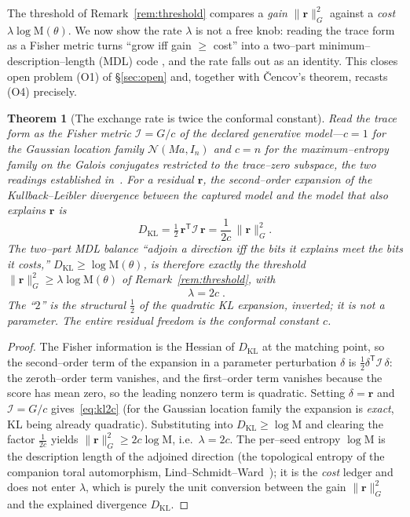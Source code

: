 \documentclass[11pt]{article}
\theoremstyle{plain}
\newtheorem{theorem}{Theorem}[section]
\theoremstyle{definition}
\theoremstyle{remark}
\newcommand{\Mah}{\mathrm{M}}
\newcommand{\Fish}{\mathcal{I}}
\newcommand{\rr}{\mathbf{r}}
\newcommand{\GG}{G}
\newcommand{\transpose}{^{\mathsf{T}}}
\begin{document}
The threshold of Remark~\ref{rem:threshold} compares a \emph{gain} $\lVert\rr\rVert_\GG^2$ against a \emph{cost}
$\lambda\log\Mah(\theta)$. We now show the rate $\lambda$ is not a free knob: reading the trace form as a Fisher
metric turns ``grow iff gain $\ge$ cost'' into a two--part minimum--description--length (MDL) code
\cite{Rissanen}, and the rate falls out as an identity. This closes open problem (O1) of \S\ref{sec:open} and,
together with \v{C}encov's theorem, recasts (O4) precisely.

\begin{theorem}[The exchange rate is twice the conformal constant]\label{thm:lambda2c}
Read the trace form as the Fisher metric $\Fish=\GG/c$ of the declared generative model---$c=1$ for the
Gaussian location family $\mathcal N(Ma,I_n)$ and $c=n$ for the maximum--entropy family on the Galois conjugates
restricted to the trace--zero subspace, the two readings established in~\cite{VectorSubstrate}. For a residual
$\rr$, the second--order expansion of the Kullback--Leibler divergence between the captured model and the model
that also explains $\rr$ is
\begin{equation}\label{eq:kl2c}
  D_{\mathrm{KL}}=\tfrac12\,\rr\transpose\Fish\,\rr=\frac1{2c}\,\lVert\rr\rVert_\GG^2 .
\end{equation}
The two--part MDL balance ``adjoin a direction iff the bits it explains meet the bits it costs,''
$D_{\mathrm{KL}}\ge\log\Mah(\theta)$, is therefore \emph{exactly} the threshold
$\lVert\rr\rVert_\GG^2\ge\lambda\log\Mah(\theta)$ of Remark~\ref{rem:threshold}, with
\begin{equation}\label{eq:lambda2c}
  \boxed{\;\lambda=2c\;}.
\end{equation}
The ``$2$'' is the structural $\tfrac12$ of the quadratic KL expansion, inverted; it is not a parameter. The
entire residual freedom is the conformal constant $c$.
\end{theorem}
\begin{proof}
The Fisher information is the Hessian of $D_{\mathrm{KL}}$ at the matching point, so the second--order term of
the expansion in a parameter perturbation $\delta$ is $\tfrac12\delta\transpose\Fish\,\delta$: the zeroth--order
term vanishes, and the first--order term vanishes because the score has mean zero, so the leading nonzero term
is quadratic. Setting $\delta=\rr$ and $\Fish=\GG/c$ gives~\eqref{eq:kl2c} (for the Gaussian location family the
expansion is \emph{exact}, KL being already quadratic). Substituting into $D_{\mathrm{KL}}\ge\log\Mah$ and
clearing the factor $\tfrac1{2c}$ yields $\lVert\rr\rVert_\GG^2\ge 2c\log\Mah$, i.e.\ $\lambda=2c$. The per--seed
entropy $\log\Mah$ is the description length of the adjoined direction (the topological entropy of the companion
toral automorphism, Lind--Schmidt--Ward~\cite{LSW}); it is the \emph{cost} ledger and does not enter $\lambda$,
which is purely the unit conversion between the gain $\lVert\rr\rVert_\GG^2$ and the explained divergence
$D_{\mathrm{KL}}$.
\end{proof}
\end{document}
